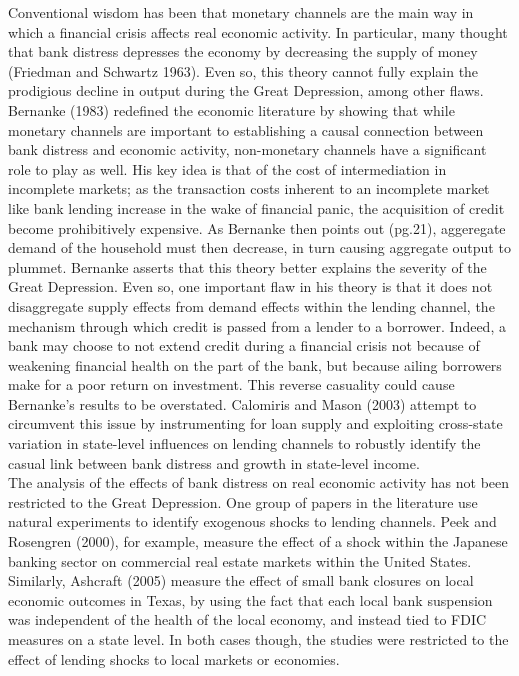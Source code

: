 \documentclass[letter,11pt]{article}
\begin{document}
{\indent Conventional wisdom has been that monetary channels are the main way in which a financial crisis affects real economic activity. In particular, many thought that bank distress depresses the economy by decreasing the supply of money (Friedman and Schwartz 1963). Even so, this theory cannot fully explain the prodigious decline in output during the Great Depression, among other flaws. Bernanke (1983) redefined the economic literature by showing that while monetary channels are important to establishing a causal connection between bank distress and economic activity, non-monetary channels have a significant role to play as well. His key idea is that of the cost of intermediation in incomplete markets; as the transaction costs inherent to an incomplete market like bank lending increase in the wake of financial panic, the acquisition of credit become prohibitively expensive. As Bernanke then points out (pg.21), aggeregate demand of the household must then decrease, in turn causing aggregate output to plummet. Bernanke asserts that this theory better explains the severity of the Great Depression. Even so, one important flaw in his theory is that it does not disaggregate supply effects from demand effects within the lending channel, the mechanism through which credit is passed from a lender to a borrower. Indeed, a bank may choose to not extend credit during a financial crisis not because of weakening financial health on the part of the bank, but because ailing borrowers make for a poor return on investment. This reverse casuality could cause Bernanke's results to be overstated. Calomiris and Mason (2003) attempt to circumvent this issue by instrumenting for loan supply and exploiting cross-state variation in state-level influences on lending channels to robustly identify the casual link between bank distress and growth in state-level income. 
\\
\indent The analysis of the effects of bank distress on real economic activity has not been restricted to the Great Depression. One group of papers in the literature use natural experiments to identify exogenous shocks to lending channels. Peek and Rosengren (2000), for example, measure the effect of a shock within the Japanese banking sector on commercial real estate markets within the United States. Similarly, Ashcraft (2005) measure the effect of small bank closures on local economic outcomes in Texas, by using the fact that each local bank suspension was independent of the health of the local economy, and instead tied to FDIC measures on a state level. In both cases though, the studies were restricted to the effect of lending shocks to local markets or economies.
}
\end{document}
